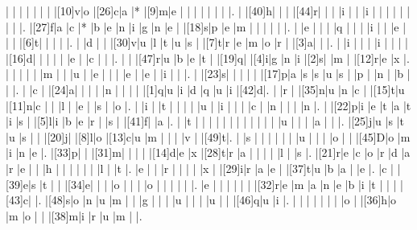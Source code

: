 \documentclass[12pt]{article}
\begin{document}
\begin{Puzzle}{22}{24}
  |{}  |{}  |{}  |{}  |{}  |{}  |{}  |[10]v|o   |[26]c|a   |*   |[9]m|e   |{}  |{}  |{}  |{}  |{}  |{}  |{}  |.
  |{}  |[40]h|{}  |{}  |{}  |[44]r|{}  |{}  |{}  |i   |{}  |{}  |i   |{}  |{}  |{}  |{}  |{}  |{}  |{}  |{}  |.
  |[27]f|a   |c   |*   |b   |e   |n   |i   |g   |n   |e   |{}  |[18]s|p   |e   |m   |{}  |{}  |{}  |{}  |{}  |.
  |{}  |e   |{}  |{}  |{}  |q   |{}  |{}  |{}  |i   |{}  |{}  |e   |{}  |{}  |{}  |[6]t|{}  |{}  |{}  |{}  |.
  |{}  |d   |{}  |{}  |[30]v|u   |l   |t   |u   |s   |{}  |[7]t|r   |e   |m   |o   |r   |{}  |[3]a|{}  |{}  |.
  |{}  |i   |{}  |{}  |{}  |i   |{}  |{}  |{}  |{}  |[16]d|{}  |{}  |{}  |{}  |{}  |e   |{}  |c   |{}  |{}  |.
  |{}  |{}  |[47]r|u   |b   |e   |t   |{}  |[19]q|{}  |[4]i|g   |n   |i   |[2]s|{}  |m   |{}  |[12]r|e   |x   |.
  |{}  |{}  |{}  |{}  |{}  |m   |{}  |{}  |u   |{}  |e   |{}  |{}  |{}  |e   |{}  |e   |{}  |i   |{}  |{}  |.
  |{}  |[23]s|{}  |{}  |{}  |{}  |{}  |[17]p|a   |s   |s   |u   |s   |{}  |p   |{}  |n   |{}  |b   |{}  |{}  |.
  |{}  |c   |{}  |[24]a|{}  |{}  |{}  |{}  |n   |{}  |{}  |{}  |{}  |[1]q|u   |i   |d   |q   |u   |i   |[42]d|.
  |{}  |r   |{}  |[35]n|u   |n   |c   |{}  |[15]t|u   |[11]n|c   |{}  |{}  |l   |{}  |e   |{}  |s   |{}  |o   |.
  |{}  |i   |{}  |t   |{}  |{}  |{}  |{}  |u   |{}  |i   |{}  |{}  |{}  |c   |{}  |n   |{}  |{}  |{}  |n   |.
  |{}  |[22]p|i   |e   |t   |a   |t   |i   |s   |{}  |[5]l|i   |b   |e   |r   |{}  |s   |{}  |[41]f|{}  |a   |.
  |{}  |t   |{}  |{}  |{}  |{}  |{}  |{}  |{}  |{}  |{}  |{}  |{}  |{}  |u   |{}  |{}  |{}  |a   |{}  |{}  |.
  |[25]j|u   |s   |t   |u   |s   |{}  |{}  |[20]j|{}  |[8]l|o   |[13]c|u   |m   |{}  |{}  |{}  |v   |{}  |[49]t|.
  |{}  |s   |{}  |{}  |{}  |{}  |{}  |{}  |u   |{}  |{}  |{}  |o   |{}  |{}  |[45]D|o   |m   |i   |n   |e   |.
  |[33]p|{}  |{}  |[31]m|{}  |{}  |{}  |{}  |[14]d|e   |x   |[28]t|r   |a   |{}  |{}  |{}  |{}  |l   |{}  |s   |.
  |[21]r|e   |c   |o   |r   |d   |a   |r   |e   |{}  |{}  |h   |{}  |{}  |{}  |{}  |{}  |{}  |l   |{}  |t   |.
  |e   |{}  |{}  |r   |{}  |{}  |{}  |{}  |x   |{}  |[29]i|r   |a   |e   |{}  |[37]t|u   |b   |a   |{}  |e   |.
  |c   |{}  |[39]e|s   |t   |{}  |{}  |[34]e|{}  |{}  |{}  |o   |{}  |{}  |{}  |o   |{}  |{}  |{}  |{}  |{}  |.
  |e   |{}  |{}  |{}  |{}  |{}  |{}  |[32]r|e   |m   |a   |n   |e   |b   |i   |t   |{}  |{}  |{}  |[43]c|{}  |.
  |[48]s|o   |n   |u   |m   |{}  |{}  |g   |{}  |{}  |{}  |u   |{}  |{}  |{}  |u   |{}  |{}  |[46]q|u   |i   |.
  |{}  |{}  |{}  |{}  |{}  |{}  |{}  |o   |{}  |[36]h|o   |m   |o   |{}  |{}  |[38]m|i   |r   |u   |m   |{}  |.
\end{Puzzle}
\end{document}

